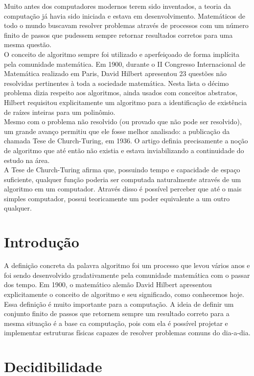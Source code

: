 \documentclass[a4paper,10pt]{article}
\begin{document}
Muito antes dos computadores modernos terem sido inventados, a teoria da computação já havia sido iniciada e estava em desenvolvimento. Matemáticos de todo o mundo buscavam resolver problemas através de processos com um número finito de passos que pudessem sempre retornar resultados corretos para uma mesma questão.\\
O conceito de algoritmo sempre foi utilizado e aperfeiçoado de forma implícita pela comunidade matemática. Em 1900, durante o II Congresso Internacional de Matemática realizado em Paris, David Hilbert apresentou 23 questões não resolvidas pertinentes à toda a sociedade matemática. Nesta lista o décimo problema dizia respeito aos algoritmos, ainda usados com conceitos abstratos, Hilbert requisitou explicitamente um algoritmo para a identificação de existência de raízes inteiras para um polinômio.\\
Mesmo com o problema não resolvido (ou provado que não pode ser resolvido), um grande avanço permitiu que ele fosse melhor analisado: a publicação da chamada Tese de Church-Turing, em 1936. O artigo definia precisamente a noção de algoritmo que até então não existia e estava inviabilizando a continuidade do estudo na área.\\
A Tese de Church-Turing afirma que, possuindo tempo e capacidade de espaço suficiente, qualquer função poderia ser computada naturalmente através de um algoritmo em um computador. Através disso é possível perceber que até o mais simples computador, possui teoricamente um poder equivalente a um outro qualquer. \\

\section{Introdu\c{c}\~ao}

A definição concreta da palavra algoritmo foi um processo que levou vários anos e foi sendo desenvolvido gradativamente pela comunidade matemática com o passar dos tempo. Em 1900, o matemático alemão David Hilbert apresentou explicitamente o conceito de algoritmo e seu significado, como conhecemos hoje. Essa definição é muito importante para a computação. A ideia de definir um conjunto finito de passos que retornem sempre um resultado correto para a mesma situação é a base ca computação, pois com ela é possível projetar e implementar estruturas físicas capazes de resolver problemas comuns do dia-a-dia.

\section{Decidibilidade}
\end{document}
